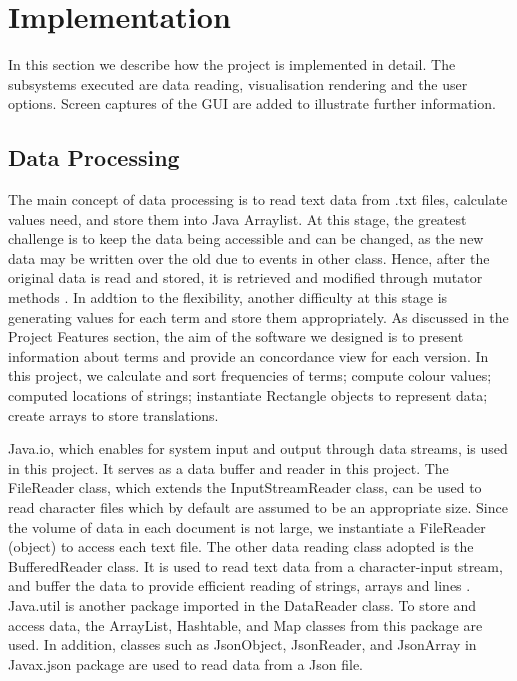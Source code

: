 \clearpage
\section{Implementation}
In this section we describe how the project is implemented in detail. The subsystems executed are data reading, visualisation rendering and the user options. Screen captures of the GUI are added to illustrate further information.

\subsection{Data Processing}

The main concept of data processing is to read text data from .txt files, calculate values need, and store them into Java Arraylist. At this stage, the greatest challenge is to keep the data being accessible and can be changed, as  the new data may be written over the old due to events in other class. Hence, after the original data is read and stored, it is retrieved and modified through  mutator methods \cite{Laramee2013}. In addtion to the flexibility, another difficulty at this stage is generating values for each term and store them appropriately. As discussed in the Project Features section, the aim of the software we designed is to present information about terms and provide an concordance view for each version. In this project, we calculate and sort frequencies of terms; compute colour values; computed locations of strings; instantiate Rectangle objects to represent data; create arrays to store translations.

Java.io, which enables for system input and output through data streams, is used in this project. It serves as a data buffer and reader in this project. The FileReader class, which extends the InputStreamReader class, can be used to read character files which by default are assumed to be an appropriate size. Since the volume of data in each document is not large, we instantiate a FileReader (object) to access each text file. The other data reading class adopted is the BufferedReader class. It is used to read text data from a character-input stream, and buffer the data to provide efficient reading of strings, arrays and lines \cite{Gosling2014}. Java.util is another package imported in the DataReader class. To store and access data, the ArrayList, Hashtable, and Map classes from this package are used. In addition, classes such as JsonObject, JsonReader, and JsonArray in Javax.json package are used to read data from a Json file.

